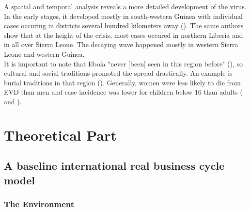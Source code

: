 \documentclass{article}
\begin{document}
A spatial and temporal analysis reveals a more detailed development of the virus. In the early stages, it developed mostly in south-western Guinea with individual cases occuring in districts several hundred kilometers away (\cite{ord2018retrospective}). The same authors show that at the height of the crisis, most cases occured in northern Liberia and in all over Sierra Leone. The decaying wave happened mostly in western Sierra Leone and western Guinea.\\
It is important to note that Ebola "never [been] seen in this region before" (\cite{frontieres2015pushed}), so cultural and social traditions promoted the spread drastically. An example is burial traditions in that region (\cite{who2014ebola}). Generally, women were less likely to die from EVD than men and case incidence was lower for children below 16 than adults (\cite{who2016ebola} and \cite{who2015ebola}).

\section{Theoretical Part}

\subsection{A baseline international real business cycle model}

\subsubsection{The Environment}
\end{document}
